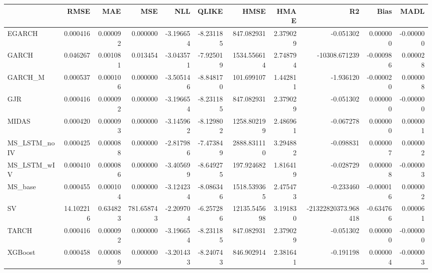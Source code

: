 \begin{tabular}{lrrrrrrrrrr}
\toprule
 & RMSE & MAE & MSE & NLL & QLIKE & HMSE & HMAE & R2 & Bias & MADL \\
\midrule
EGARCH & 0.000416 & 0.000092 & 0.000000 & -3.196654 & -8.231185 & 847.082931 & 2.379029 & -0.051302 & 0.000000 & -0.000000 \\
GARCH & 0.046267 & 0.001081 & 0.013454 & -3.043571 & -7.925019 & 1534.556614 & 2.748794 & -10308.671239 & -0.000986 & 0.000028 \\
GARCH_M & 0.000537 & 0.000106 & 0.000000 & -3.505146 & -8.848170 & 101.699107 & 1.442811 & -1.936120 & -0.000020 & 0.000008 \\
GJR & 0.000416 & 0.000092 & 0.000000 & -3.196654 & -8.231185 & 847.082931 & 2.379029 & -0.051302 & 0.000000 & -0.000000 \\
MIDAS & 0.000420 & 0.000093 & 0.000000 & -3.145962 & -8.129802 & 1258.802199 & 2.486961 & -0.067278 & 0.000000 & 0.000001 \\
MS_LSTM_noIV & 0.000425 & 0.000088 & 0.000000 & -2.817986 & -7.473849 & 2888.831110 & 3.294882 & -0.098831 & 0.000007 & 0.000002 \\
MS_LSTM_wIV & 0.000410 & 0.000086 & 0.000000 & -3.405699 & -8.649275 & 197.924682 & 1.816419 & -0.028729 & 0.000008 & -0.000003 \\
MS_base & 0.000455 & 0.000104 & 0.000000 & -3.124234 & -8.086346 & 1518.539365 & 2.475473 & -0.233460 & -0.000016 & 0.000002 \\
SV & 14.102216 & 0.634823 & 781.658743 & -2.209704 & -6.257286 & 12135.545698 & 3.191830 & -21322820373.968418 & -0.634766 & 0.000061 \\
TARCH & 0.000416 & 0.000092 & 0.000000 & -3.196654 & -8.231185 & 847.082931 & 2.379029 & -0.051302 & 0.000000 & -0.000000 \\
XGBoost & 0.000458 & 0.000089 & 0.000000 & -3.201433 & -8.240743 & 846.902914 & 2.381641 & -0.191198 & 0.000004 & -0.000003 \\
\bottomrule
\end{tabular}
